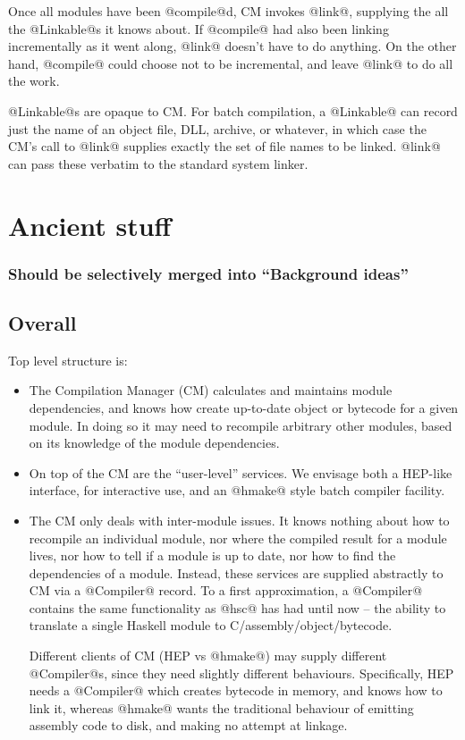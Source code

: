\documentclass[11pt]{article}
\begin{document}
Once all modules have been @compile@d, CM invokes @link@, supplying
the all the @Linkable@s it knows about.  If @compile@ had also been
linking incrementally as it went along, @link@ doesn't have to do
anything.  On the other hand, @compile@ could choose not to be
incremental, and leave @link@ to do all the work.

@Linkable@s are opaque to CM.  For batch compilation, a @Linkable@
can record just the name of an object file, DLL, archive, or whatever,
in which case the CM's call to @link@ supplies exactly the set of
file names to be linked.  @link@ can pass these verbatim to the
standard system linker.




\section{Ancient stuff}
\subsubsection*{Should be selectively merged into ``Background ideas''}

\subsection{Overall}
Top level structure is:
\begin{itemize}
\item The Compilation Manager (CM) calculates and maintains module
      dependencies, and knows how create up-to-date object or bytecode
      for a given module.  In doing so it may need to recompile 
      arbitrary other modules, based on its knowledge of the module
      dependencies.  
\item On top of the CM are the ``user-level'' services.  We envisage
      both a HEP-like interface, for interactive use, and an
      @hmake@ style batch compiler facility.
\item The CM only deals with inter-module issues.  It knows nothing
      about how to recompile an individual module, nor where the compiled
      result for a module lives, nor how to tell if 
      a module is up to date, nor how to find the dependencies of a module.
      Instead, these services are supplied abstractly to CM via a
      @Compiler@ record.  To a first approximation, a @Compiler@
      contains
      the same functionality as @hsc@ has had until now -- the ability to
      translate a single Haskell module to C/assembly/object/bytecode.

      Different clients of CM (HEP vs @hmake@) may supply different
      @Compiler@s, since they need slightly different behaviours.
      Specifically, HEP needs a @Compiler@ which creates bytecode
      in memory, and knows how to link it, whereas @hmake@ wants
      the traditional behaviour of emitting assembly code to disk,
      and making no attempt at linkage.
\end{itemize}
\end{document}
